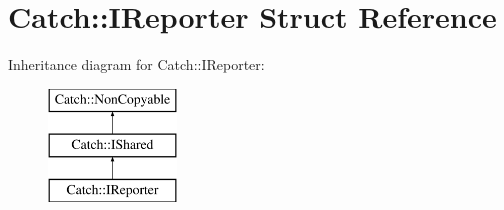 \hypertarget{struct_catch_1_1_i_reporter}{\section{Catch\-:\-:I\-Reporter Struct Reference}
\label{struct_catch_1_1_i_reporter}
}
Inheritance diagram for Catch\-:\-:I\-Reporter\-:\begin{figure}[H]
\begin{center}
\leavevmode
\includegraphics[height=3.000000cm]{struct_catch_1_1_i_reporter}
\end{center}
\end{figure}
